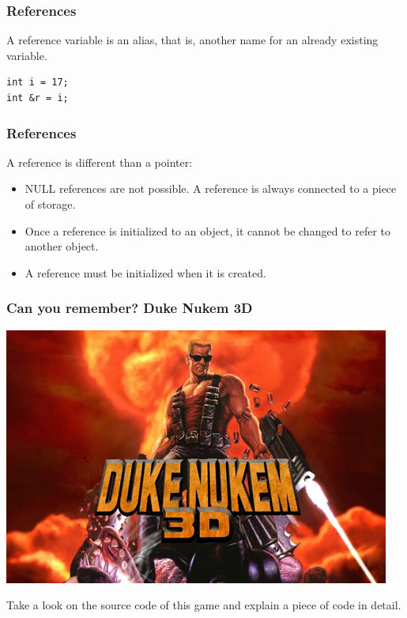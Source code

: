 \begin{frame}[fragile]
\frametitle{References}
A reference variable is an alias, that is, another name for an already existing
variable.
\begin{lstlisting}
int i = 17;
int &r = i;
\end{lstlisting}
\end{frame}

\begin{frame}[fragile]
\frametitle{References}
A reference is different than a pointer:
\begin{itemize}
\item NULL references are not possible. A reference is always connected to a piece of storage.
\item Once a reference is initialized to an object, it cannot be changed to refer to another object.
\item A reference must be initialized when it is created.
\end{itemize}
\end{frame}

\begin{frame}[fragile]
\frametitle{Can you remember? Duke Nukem 3D}
\includegraphics[scale=0.3]{img/dukenukem.jpg}
\begin{exercise}
Take a look on the source code of this game and explain a piece of code
in detail.
\end{exercise}
\end{frame}

